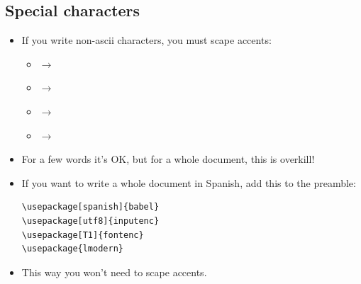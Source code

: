 \documentclass{beamer}
\begin{document}
\subsection*{Special characters}
\begin{frame}[fragile]{\insertsubsection}
\begin{itemize}

\item If you write non-ascii characters, you must scape accents:
\begin{itemize}
  \item {} $\to$ 
  \item {} $\to$ 
  \item {} $\to$ 
  \item {} $\to$ 
\end{itemize}

\item For a few words it's OK, but for a whole document, this is overkill!

\item If you want to write a whole document in Spanish, add this to the preamble:

\begin{verbatim}
\usepackage[spanish]{babel}
\usepackage[utf8]{inputenc} 
\usepackage[T1]{fontenc}
\usepackage{lmodern}
\end{verbatim}

\item This way you won't need to scape accents.

\end{itemize}
\end{frame}

\end{document}
